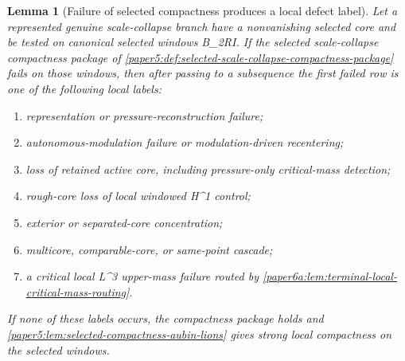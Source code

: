 \documentclass[11pt]{amsart}
\def\({}%
\def\){}%
\theoremstyle{plain}
\newtheorem{lemma}[lemma]{Lemma}
\theoremstyle{definition}
\theoremstyle{remark}
\begin{document}
\begin{lemma}[Failure of selected compactness produces a local defect label]
\label{paper5:lem:selected-compactness-defect-label}
Let a represented genuine scale-collapse branch have a nonvanishing selected
core and be tested on canonical selected windows \(B_{2R}\times I\).  If the
selected scale-collapse compactness package of
\cref{paper5:def:selected-scale-collapse-compactness-package} fails on those
windows, then after passing to a subsequence the first failed row is one of the
following local labels:
\begin{enumerate}[label=\textup{(\roman*)}]
\item representation or pressure-reconstruction failure;
\item autonomous-modulation failure or modulation-driven recentering;
\item loss of retained active core, including pressure-only critical-mass
detection;
\item rough-core loss of local windowed \(H^1\) control;
\item exterior or separated-core concentration;
\item multicore, comparable-core, or same-point cascade;
\item a critical local \(L^3\) upper-mass failure routed by
\cref{paper6a:lem:terminal-local-critical-mass-routing}.
\end{enumerate}
If none of these labels occurs, the compactness package holds and
\cref{paper5:lem:selected-compactness-aubin-lions} gives strong local
compactness on the selected windows.
\end{lemma}
\end{document}
